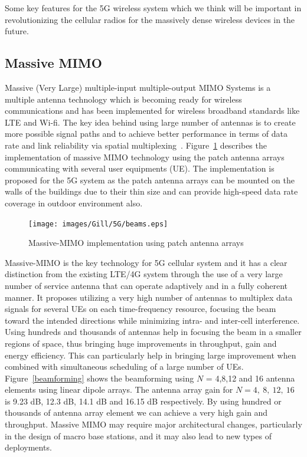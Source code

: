 Some key features for the 5G wireless system which we think will be important in revolutionizing the cellular radios for the massively dense wireless devices in the future.

\subsection{Massive MIMO}

Massive (Very Large) multiple-input multiple-output MIMO Systems is a multiple antenna technology which is becoming ready for wireless communications and has been implemented for wireless broadband standards like LTE and Wi-fi. The key idea behind using large number of antennas is to create more possible signal paths and to achieve better performance in terms of data rate and link reliability via spatial multiplexing~\cite{massivemimo}. Figure~\ref{massivemimo} describes the implementation of massive MIMO technology using the patch antenna arrays communicating with several user equipments (UE). The implementation is proposed for the 5G system as the patch antenna arrays can be mounted on the walls of the buildings due to their thin size and can provide high-speed data rate coverage in outdoor environment also. 

\begin{figure}[!ht]
	\centering
\texttt{[image: images/Gill/5G/beams.eps]}
	\caption{Massive-MIMO implementation using patch antenna arrays}
	\label{massivemimo}
\end{figure}

Massive-MIMO is the key technology for 5G cellular system and it has a clear distinction from the existing LTE/4G system through the use of a very large number of service antenna that can operate adaptively and in a fully coherent manner. It proposes utilizing a very high number of antennas to multiplex data signals for several UEs on each time-frequency resource, focusing the beam toward the intended directions while minimizing intra- and inter-cell interference. Using hundreds and thousands of antennas help in focusing the beam in a smaller regions of space, thus bringing huge improvements in throughput, gain and energy efficiency. This can particularly help in bringing large improvement when combined with simultaneous scheduling of a large number of UEs. Figure~\ref{beamforming} shows the beamforming using $N$ = 4,8,12 and 16 antenna elements using linear dipole arrays. The antenna array gain for $N = 4,~8,~12,~16$ is 9.23 dB, 12.3 dB, 14.1 dB and 16.15 dB respectively. By using hundred or thousands of antenna array element we can achieve a very high gain and throughput. Massive MIMO may require major architectural changes, particularly in the design of macro base stations, and it may also lead to new types of deployments. 

